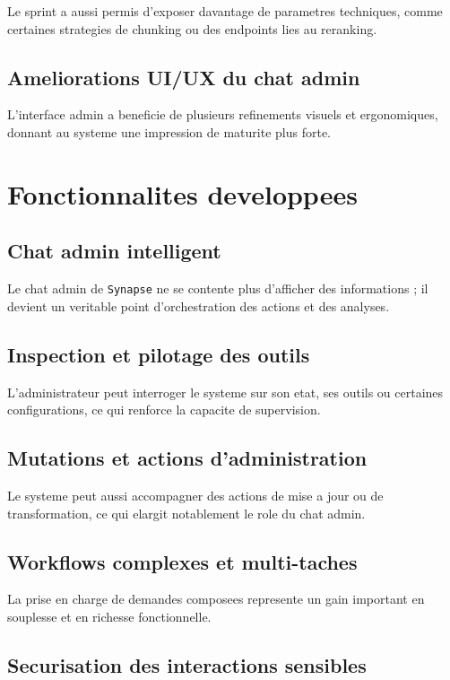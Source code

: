Le sprint a aussi permis d'exposer davantage de parametres techniques, comme certaines strategies de chunking ou des endpoints lies au reranking.

\subsection{Ameliorations UI/UX du chat admin}

L'interface admin a beneficie de plusieurs refinements visuels et ergonomiques, donnant au systeme une impression de maturite plus forte.

\section{Fonctionnalites developpees}

\subsection{Chat admin intelligent}

Le chat admin de \texttt{Synapse} ne se contente plus d'afficher des informations ; il devient un veritable point d'orchestration des actions et des analyses.

\subsection{Inspection et pilotage des outils}

L'administrateur peut interroger le systeme sur son etat, ses outils ou certaines configurations, ce qui renforce la capacite de supervision.

\subsection{Mutations et actions d'administration}

Le systeme peut aussi accompagner des actions de mise a jour ou de transformation, ce qui elargit notablement le role du chat admin.

\subsection{Workflows complexes et multi-taches}

La prise en charge de demandes composees represente un gain important en souplesse et en richesse fonctionnelle.

\subsection{Securisation des interactions sensibles}

